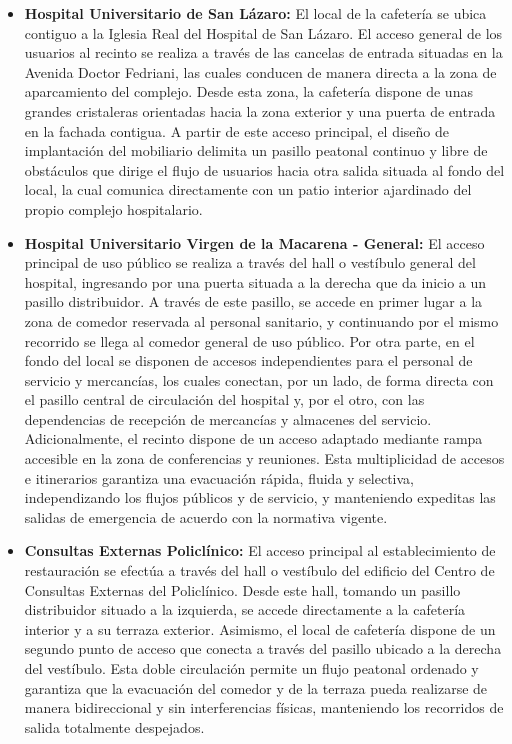 \documentclass[12pt,a4paper]{article}
\begin{document}
\begin{itemize}
    \item \textbf{Hospital Universitario de San Lázaro:}
    El local de la cafetería se ubica contiguo a la Iglesia Real del Hospital de San Lázaro. El acceso general de los usuarios al recinto se realiza a través de las cancelas de entrada situadas en la Avenida Doctor Fedriani, las cuales conducen de manera directa a la zona de aparcamiento del complejo. Desde esta zona, la cafetería dispone de unas grandes cristaleras orientadas hacia la zona exterior y una puerta de entrada en la fachada contigua. A partir de este acceso principal, el diseño de implantación del mobiliario delimita un pasillo peatonal continuo y libre de obstáculos que dirige el flujo de usuarios hacia otra salida  situada al fondo del local, la cual comunica directamente con un patio interior ajardinado del propio complejo hospitalario.
    
    \item \textbf{Hospital Universitario Virgen de la Macarena - General:}
    El acceso principal de uso público se realiza a través del hall o vestíbulo general del hospital, ingresando por una puerta situada a la derecha que da inicio a un pasillo distribuidor. A través de este pasillo, se accede en primer lugar a la zona de comedor reservada al personal sanitario, y continuando por el mismo recorrido se llega al comedor general de uso público. Por otra parte, en el fondo del local se disponen de accesos independientes para el personal de servicio y mercancías, los cuales conectan, por un lado, de forma directa con el pasillo central de circulación del hospital y, por el otro, con las dependencias de recepción de mercancías y almacenes del servicio. Adicionalmente, el recinto dispone de un acceso adaptado mediante rampa accesible en la zona de conferencias y reuniones. Esta multiplicidad de accesos e itinerarios garantiza una evacuación rápida, fluida y selectiva, independizando los flujos públicos y de servicio, y manteniendo expeditas las salidas de emergencia de acuerdo con la normativa vigente.
    
    \item \textbf{Consultas Externas Policlínico:}
    El acceso principal al establecimiento de restauración se efectúa a través del hall o vestíbulo del edificio del Centro de Consultas Externas del Policlínico. Desde este hall, tomando un pasillo distribuidor situado a la izquierda, se accede directamente a la cafetería interior y a su terraza exterior. Asimismo, el local de cafetería dispone de un segundo punto de acceso que conecta a través del pasillo ubicado a la derecha del vestíbulo. Esta doble circulación permite un flujo peatonal ordenado y garantiza que la evacuación del comedor y de la terraza pueda realizarse de manera bidireccional y sin interferencias físicas, manteniendo los recorridos de salida totalmente despejados.
\end{itemize}
\end{document}
